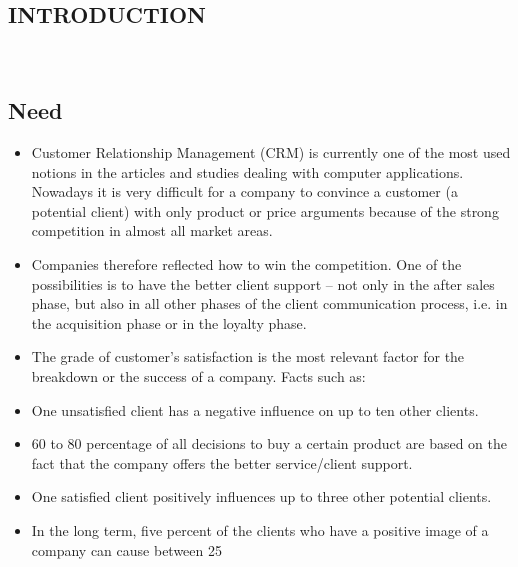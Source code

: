 \documentclass[12pt,a4paper]{article}
\begin{document}
\newpage
{}
\begin{center}
\section{INTRODUCTION}
\end{center}
\pagestyle{plain} 
\hspace{0.7cm}
\\
\subsection{Need}
\begin{itemize}
\item Customer Relationship Management (CRM) is currently one of the most used notions in the articles and studies dealing with computer applications. Nowadays it is very difficult for a company to convince a customer (a potential client) with only product or price arguments because of the strong competition in almost all market areas.
\item Companies therefore reflected how to win the competition. One of the possibilities is to have the better client support – not only in the after sales phase, but also in all other phases of the client communication process, i.e. in the acquisition phase or in the loyalty phase.
\item The grade of customer’s satisfaction is the most relevant factor for the breakdown or the success of a company. Facts such as:
\item One unsatisfied client has a negative influence on up to ten other clients.
\item 60 to 80 percentage of all decisions to buy a certain product are based on the fact that the company offers the better service/client support.
\item One satisfied client positively influences up to three other potential clients.
\item In the long term, five percent of the clients who have a positive image of a company can cause between 25%
\end{itemize}
\\
\end{document}

